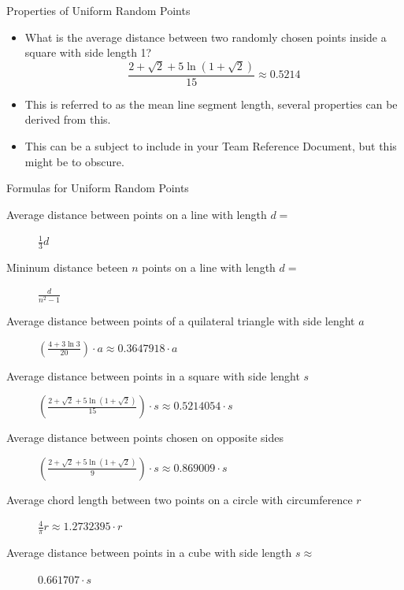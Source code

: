 \documentclass[11pt,pdf, aspectratio=169]{beamer}
\begin{document}
  \begin{frame}{Properties of Uniform Random Points}
    \begin{itemize}
      \item What is the average distance between two randomly chosen points inside a square with side length 1?\\
      \[
        \frac{2 + \sqrt {2} + 5 \ln\left(1 + \sqrt {2}\right)}{15} \approx 0.5214
      \]
      \item This is referred to as the mean line segment length, several properties can be derived from this.
      \item This can be a subject to include in your Team Reference Document, but this might be to obscure.
    \end{itemize}
  \end{frame}
  \begin{frame}{Formulas for Uniform Random Points} %
    \begin{description}
      \item[Average distance between points on a line with length $d=$] $\frac{1}{3}d$
      \item[Mininum distance beteen $n$ points on a line with length $d=$]$\frac{d}{n^2-1}$
      \item[Average distance between points of a quilateral triangle with side lenght $a$] $\left( \frac{4 + 3 \ln 3}{20} \right)\cdot a \approx 0.3647918\cdot a$
      \item[Average distance between points in a square with side lenght $s$] $\left(\frac{2 + \sqrt {2} + 5 \ln\left(1 + \sqrt {2}\right)}{15} \right)\cdot s \approx 0.5214054\cdot s$
      \item[Average distance between points chosen on opposite sides] $\left(\frac{2 + \sqrt {2} + 5 \ln\left(1 + \sqrt {2}\right)}{9} \right)\cdot s \approx 0.869009\cdot s$
      \item[Average chord length between two points on a circle with circumference $r$] $\frac{4}{\pi}r \approx 1.2732395 \cdot r$
      \item[Average distance between points in a cube with side length $s\approx$] $0.661707\cdot s$ %
    \end{description}
  \end{frame}
\end{document}
